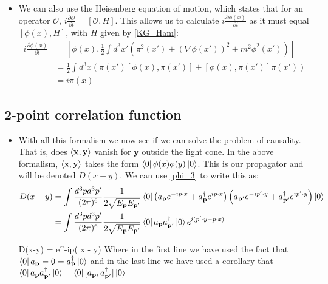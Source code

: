 \documentclass[11pt]{article}
\renewenvironment{flalign}{\vspace{-2mm}\empheq[box=\tcbhighmath]{align}}{\endempheq}
\numberwithin{equation}{section}
\begin{document}
\begin{itemize}
  \item We can also use the Heisenberg equation of motion, which states that for an operator $\mathcal{O}$, $i\frac{\partial \mathcal{O}}{\partial t} = [\mathcal{O},H]$. This allows us to calculate $i\frac{\partial \phi(x)}{\partial t}$ as it must equal $[\phi(x),H]$, with $H$ given by \ref{KG_Ham}:
  \begin{equation*}
  \begin{split}
    i\frac{\partial \phi(x)}{\partial t} & = [\phi(x),\frac{1}{2}\int d^3x'\left(\pi^2(x') +(\nabla\phi(x'))^2+m^2\phi^2(x')\right) ] \\
      & =  \frac{1}{2}\int d^3x \left(\pi(x')[\phi(x), \pi(x')]+[\phi(x), \pi(x')]\pi(x') \right) \\
      & = i \pi(x)
  \end{split}
  \end{equation*}

\end{itemize}
\subsection{2-point correlation function}
\begin{itemize}
  \item  With all this formalism we now see if we can solve the problem of causality. That is, does $\braket{\textbf{x},\textbf{y}}$ vanish for $\textbf{y}$ outside the light cone. In the above formalism, $\braket{\textbf{x},\textbf{y}}$ takes the form $\bra{0}\phi(x)\phi(y)\ket{0}$. This is our propagator and will be denoted $D(x-y)$. We can use \ref{phi_3} to write this as:
  \begin{align*}
   D(x-y) & = \int \frac{d^3pd^3p'}{(2\pi)^6}\frac{1}{2\sqrt{E_{\textbf{p}}E_{\textbf{p}'}}}\bra{0}\left(a_{\textbf{p}}e^{-ip \cdot x}+a^{\dagger}_{\textbf{p}}e^{ip \cdot x}\right)\left(a_{\textbf{p}'}e^{-ip'\cdot y}+a^{\dagger}_{\textbf{p}'}e^{ip' \cdot y}\right)\ket{0}    \\
  & = \int \frac{d^3pd^3p'}{(2\pi)^6}\frac{1}{2\sqrt{E_{\textbf{p}}E_{\textbf{p}'}}}\bra{0}a_{\textbf{p}}a^{\dagger}_{\textbf{p}'}\ket{0}e^{i(p' \cdot y - p \cdot x) } 
  \end{align*}

  \begin{flalign}
  \label{D(x-y)}
  \implies D(x-y) = \int {}e^{-ip\cdot( x - y) }
  \end{flalign}
  Where in the first line we have used the fact that $\bra{0}a_{\textbf{p}} = 0 = a^{\dagger}_{\textbf{p}}\ket{0}$ and in the last line we have used a corollary that $\bra{0}a_{\textbf{p}}a^{\dagger}_{\textbf{p}'}\ket{0}  =\bra{0}[a_{\textbf{p}},a^{\dagger}_{\textbf{p}'}]\ket{0}$
\end{itemize}
\end{document}

